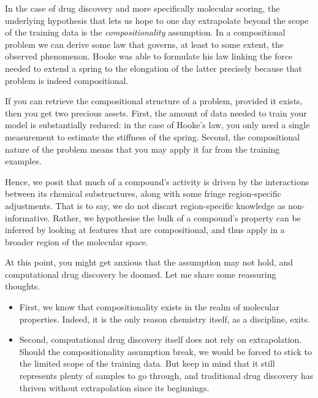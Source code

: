 \documentclass[11pt]{article}
\numberwithin{equation}{subsection}
\begin{document}
In the case of drug discovery and more specifically molecular scoring, the underlying hypothesis that lets us hope to one day extrapolate beyond the scope of the training data is the \textit{compositionality} assumption. In a compositional problem we can derive some law that governs, at least to some extent, the observed phenomenon. Hooke was able to formulate his law linking the force needed to extend a spring to the elongation of the latter precisely because that problem is indeed compositional.


If you can retrieve the compositional structure of a problem, provided it exists, then you get two precious assets. First, the amount of data needed to train your model is substantially reduced: in the case of Hooke's law, you only need a single measurement to estimate the stiffness of the spring. Second, the compositional nature of the problem means that you may apply it far from the training examples.

Hence, we posit that much of a compound's activity is driven by the interactions between its chemical substructures, along with some fringe region-specific adjustments. That is to say, we do not discart region-specific knowledge as non-informative. Rather, we hypothesise the bulk of a compound's property can be inferred by looking at features that are compositional, and thus apply in a broader region of the molecular space.

At this point, you might get anxious that the assumption may not hold, and computational drug discovery be doomed. Let me share some reassuring thoughts.
\begin{itemize}
  \item First, we know that compositionality exists in the realm of molecular properties. Indeed, it is the only reason chemistry itself, as a discipline, exits.

  \item Second, computational drug discovery itself does not rely on extrapolation. Should the compositionality assumption break, we would be forced to stick to the limited scope of the training data. But keep in mind that it still represents plenty of samples to go through, and traditional drug discovery has thriven without extrapolation since its beginnings.
\end{itemize}
\end{document}

